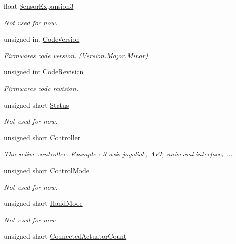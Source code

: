 \begin{DoxyCompactItemize}
float \hyperlink{struct_general_informations_ac3d8b0c6a9857e27d3420e693c993565}{Sensor\+Expansion3}
\begin{DoxyCompactList}\small\item\em Not used for now. \end{DoxyCompactList}\item 
unsigned int \hyperlink{struct_general_informations_ac71288477c2e447e7dd298ca707bcec3}{Code\+Version}
\begin{DoxyCompactList}\small\item\em Firmware\textquotesingle{}s code version. (Version.\+Major.\+Minor) \end{DoxyCompactList}\item 
unsigned int \hyperlink{struct_general_informations_a56f6f5dc8067f0ea4deb4b0c5cc3f971}{Code\+Revision}
\begin{DoxyCompactList}\small\item\em Firmware\textquotesingle{}s code revision. \end{DoxyCompactList}\item 
unsigned short \hyperlink{struct_general_informations_ada03b782731dc711fc78f2ab00fe3fcd}{Status}
\begin{DoxyCompactList}\small\item\em Not used for now. \end{DoxyCompactList}\item 
unsigned short \hyperlink{struct_general_informations_a3cd5d14a57c053719db5c02cc471005b}{Controller}
\begin{DoxyCompactList}\small\item\em The active controller. Example \+: 3-\/axis joystick, A\+PI, universal interface, ... \end{DoxyCompactList}\item 
unsigned short \hyperlink{struct_general_informations_aaac67e7cb72de84d904bf96285ce97ef}{Control\+Mode}
\begin{DoxyCompactList}\small\item\em Not used for now. \end{DoxyCompactList}\item 
unsigned short \hyperlink{struct_general_informations_a2fb3e86852c3ee8fedd27e745d71d7c7}{Hand\+Mode}
\begin{DoxyCompactList}\small\item\em Not used for now. \end{DoxyCompactList}\item 
unsigned short \hyperlink{struct_general_informations_ac8f106acda69fb0d0dc7088216854fb0}{Connected\+Actuator\+Count}

\end{DoxyCompactItemize}

